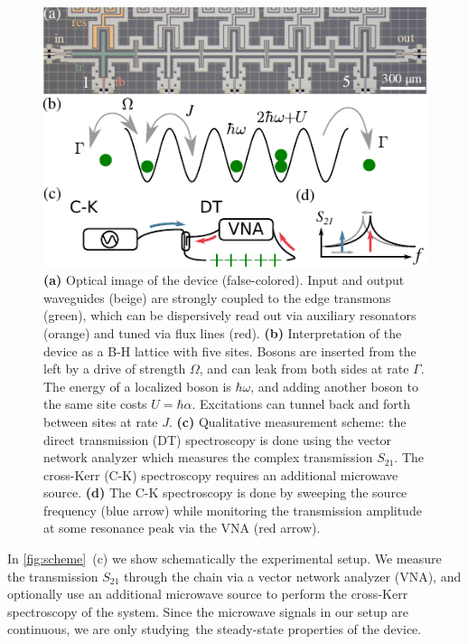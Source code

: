 \documentclass[%
 aps, pra,
 amsmath,amssymb,
 reprint,%
superscriptaddress
]{revtex4-2}
\begin{document}
\begin{figure}
	\centering
	\includegraphics[width=1\linewidth]{Pictures/scheme.pdf}
	\caption{\textbf{(a)} Optical image of the device (false-colored). Input and output waveguides (beige) are strongly coupled to the edge transmons (green), which can be dispersively read out via auxiliary resonators (orange) and tuned via flux lines (red). \textbf{(b)} Interpretation of the device as a B-H lattice with five sites. Bosons are inserted from the left by a drive of strength $\Omega$, and can leak from both sides at rate $\Gamma$. The energy of a localized boson is $\hbar \omega$, and adding another boson to the same site costs $U = \hbar \alpha$. Excitations can tunnel back and forth between sites at rate $J$. \textbf{(c)} Qualitative measurement scheme: the direct transmission (DT) spectroscopy is done using the vector network analyzer which measures the complex transmission $ S_{21} $. The cross-Kerr (C-K) spectroscopy requires an additional microwave source. \textbf{(d)} The C-K spectroscopy is done by sweeping the source frequency (blue arrow) while monitoring the transmission amplitude at some resonance peak via the VNA (red arrow).}
	\label{fig:scheme}
\end{figure}
	

In \autoref{fig:scheme}~(c) we show schematically the experimental setup. We measure the transmission $S_{21}$ through the chain via a vector network analyzer (VNA), and optionally use an additional microwave source to perform the cross-Kerr spectroscopy of the system. Since the microwave signals in our setup are continuous, we are only studying the steady-state properties of the device.
\end{document}
